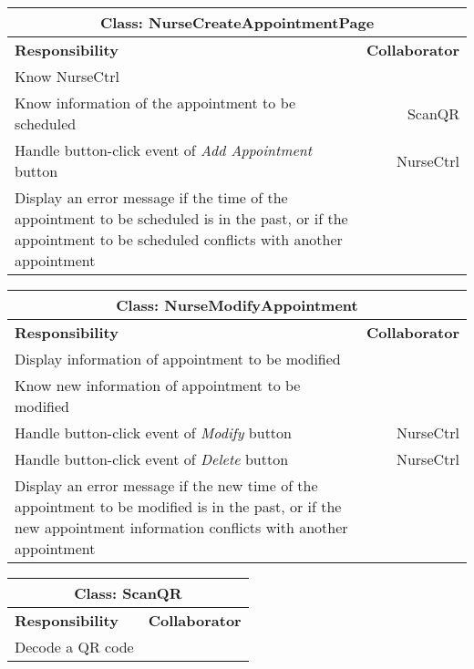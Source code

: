 \documentclass[12pt]{article}
\begin{document}
\begin{center}
\begin{tabularx}{\textwidth}{|X|r|} \hline
\multicolumn{2}{|c|}{\textbf{Class: NurseCreateAppointmentPage}}\\ \hline
\textbf{Responsibility} & \textbf{Collaborator} \\ \hline
Know NurseCtrl & \\ \hline
Know information of the appointment to be scheduled& ScanQR \\ \hline
Handle button-click event of \emph{Add Appointment} button & NurseCtrl \\ \hline
Display an error message if the time of the appointment to be scheduled is in the past, or if the appointment to be scheduled conflicts with another appointment&  \\ \hline
\end{tabularx}
\newline\newline
\end{center}

\begin{center}
\begin{tabularx}{\textwidth}{|X|r|} \hline
\multicolumn{2}{|c|}{\textbf{Class: NurseModifyAppointment}}\\ \hline
\textbf{Responsibility} & \textbf{Collaborator} \\ \hline
Display information of appointment to be modified & \\ \hline
Know new information of appointment to be modified & \\ \hline
Handle button-click event of \emph{Modify} button & NurseCtrl \\ \hline
Handle button-click event of \emph{Delete} button & NurseCtrl \\ \hline
Display an error message if the new time of the appointment to be modified is in the past, or if the new appointment information conflicts with another appointment \\ \hline

\end{tabularx}
\newline\newline
\end{center}

\begin{center}
\begin{tabularx}{\textwidth}{|X|r|} \hline
\multicolumn{2}{|c|}{\textbf{Class: ScanQR}}\\ \hline
\textbf{Responsibility} & \textbf{Collaborator} \\ \hline
Decode a QR code & \\ \hline
\end{tabularx}
\newline\newline
\end{center}
\end{document}
